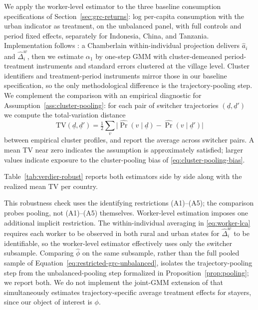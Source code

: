 We apply the worker-level estimator to the three baseline consumption specifications of Section~\ref{sec:grc-returns}: log per-capita consumption with the urban indicator as treatment, on the unbalanced panel, with full controls and period fixed effects, separately for Indonesia, China, and Tanzania.
Implementation follows \citet[][\S 3.4]{verdierAverageTreatmentEffects2020a}: a Chamberlain within-individual projection delivers $\hat a_i$ and $\hat\Delta_i^w$, then we estimate $\alpha_1$ by one-step GMM with cluster-demeaned period-treatment instruments and standard errors clustered at the village level.
Cluster identifiers and treatment-period instruments mirror those in our baseline specification, so the only methodological difference is the trajectory-pooling step.
We complement the comparison with an empirical diagnostic for Assumption~\ref{ass:cluster-pooling}: for each pair of switcher trajectories $(\underline d, \underline d')$ we compute the total-variation distance
\[
\mathrm{TV}(\underline d, \underline d') = \tfrac{1}{2}\sum_{v} \big| \hat\Pr(v\mid \underline d) - \hat\Pr(v\mid \underline d') \big|
\]
between empirical cluster profiles, and report the average across switcher pairs.
A mean TV near zero indicates the assumption is approximately satisfied; larger values indicate exposure to the cluster-pooling bias of \eqref{eq:cluster-pooling-bias}.

Table~\ref{tab:verdier-robust} reports both estimators side by side along with the realized mean TV per country.

% 


This robustness check uses the identifying restrictions (A1)--(A5); the comparison probes pooling, not (A1)--(A5) themselves.
Worker-level estimation imposes one additional implicit restriction.
The within-individual averaging in \eqref{eq:worker-lca} requires each worker to be observed in both rural and urban states for $\hat\Delta_i^w$ to be identifiable, so the worker-level estimator effectively uses only the switcher subsample.
Comparing $\hat\phi$ on the same subsample, rather than the full pooled sample of Equation~\eqref{eq:restricted-grc-unbalanced}, isolates the trajectory-pooling step from the unbalanced-pooling step formalized in Proposition~\ref{prop:pooling}; we report both. We do not implement the joint-GMM extension of \citet{verdierAverageTreatmentEffects2020a} that simultaneously estimates trajectory-specific average treatment effects for stayers, since our object of interest is $\phi$.
